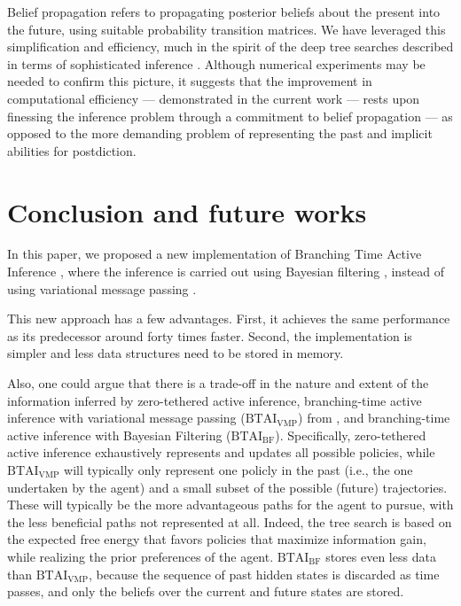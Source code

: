 \documentclass[twoside,11pt]{article}
\begin{document}
Belief propagation refers to propagating posterior beliefs about the present into the future, using suitable probability transition matrices. We have leveraged this simplification and efficiency, much in the spirit of the deep tree searches described in terms of sophisticated inference \citep{sophisticated}. Although numerical experiments may be needed to confirm this picture, it suggests that the improvement in computational efficiency --- demonstrated in the current work --- rests upon finessing the inference problem through a commitment to belief propagation --- as opposed to the more demanding problem of representing the past and implicit abilities for postdiction.

\section{Conclusion and future works} \label{sec:conclusion}

In this paper, we proposed a new implementation of Branching Time Active Inference \citep{AITS_THEORY,AITS_PRACTICE}, where the inference is carried out using Bayesian filtering \citep{BAYESIAN_FILTERING}, instead of using variational message passing \citep{AI_VMP,VMP_TUTO}.

This new approach has a few advantages. First, it achieves the same performance as its predecessor around forty times faster. Second, the implementation is simpler and less data structures need to be stored in memory.

Also, one could argue that there is a trade-off in the nature and extent of the information inferred by zero-tethered active inference, branching-time active inference with variational message passing ($\text{BTAI}_{\text{VMP}}$) from \citet{AITS_THEORY,AITS_PRACTICE}, and branching-time active inference with Bayesian Filtering ($\text{BTAI}_{\text{BF}}$). Specifically, zero-tethered active inference exhaustively represents and updates all possible policies, while $\text{BTAI}_{\text{VMP}}$ will typically only represent one policly in the past (i.e., the one undertaken by the agent) and a small subset of the possible (future) trajectories. These will typically be the more advantageous paths for the agent to pursue, with the less beneficial paths not represented at all. Indeed, the tree search is based on the expected free energy that favors policies that maximize information gain, while realizing the prior preferences of the agent. $\text{BTAI}_{\text{BF}}$ stores even less data than $\text{BTAI}_{\text{VMP}}$, because the sequence of past hidden states is discarded as time passes, and only the beliefs over the current and future states are stored.
\end{document}
